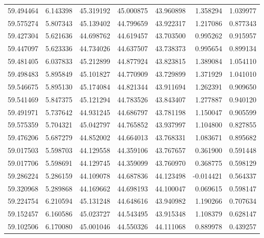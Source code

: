 \begin{tabular}{rrrrrrr}
 59.494464 &   6.143398 &         45.319192 &         45.000875 &         43.960898 &  1.358294 &  1.039977 \\
 59.575274 &   5.807343 &         45.139402 &         44.799659 &         43.922317 &  1.217086 &  0.877343 \\
 59.427304 &   5.621636 &         44.698762 &         44.619457 &         43.703500 &  0.995262 &  0.915957 \\
 59.447097 &   5.623336 &         44.734026 &         44.637507 &         43.738373 &  0.995654 &  0.899134 \\
 59.481405 &   6.037833 &         45.212899 &         44.877924 &         43.823815 &  1.389084 &  1.054110 \\
 59.498483 &   5.895849 &         45.101827 &         44.770909 &         43.729899 &  1.371929 &  1.041010 \\
 59.546675 &   5.895130 &         45.174084 &         44.821344 &         43.911694 &  1.262391 &  0.909650 \\
 59.541469 &   5.847375 &         45.121294 &         44.783526 &         43.843407 &  1.277887 &  0.940120 \\
 59.491971 &   5.737642 &         44.931245 &         44.686797 &         43.781198 &  1.150047 &  0.905599 \\
 59.575359 &   5.704321 &         45.042797 &         44.765852 &         43.937997 &  1.104800 &  0.827855 \\
 59.476206 &   5.687279 &         44.852002 &         44.664013 &         43.768331 &  1.083671 &  0.895682 \\
 59.017503 &   5.598703 &         44.129558 &         44.359106 &         43.767657 &  0.361900 &  0.591448 \\
 59.017706 &   5.598691 &         44.129745 &         44.359099 &         43.760970 &  0.368775 &  0.598129 \\
 59.286224 &   5.286159 &         44.109078 &         44.687836 &         44.123498 & -0.014421 &  0.564337 \\
 59.320968 &   5.289868 &         44.169662 &         44.698193 &         44.100047 &  0.069615 &  0.598147 \\
 59.224754 &   6.210594 &         45.131248 &         44.648616 &         43.940982 &  1.190266 &  0.707634 \\
 59.152457 &   6.160586 &         45.023727 &         44.543495 &         43.915348 &  1.108379 &  0.628147 \\
 59.102506 &   6.170080 &         45.001046 &         44.550326 &         44.111068 &  0.889978 &  0.439257 \\

\end{tabular}
